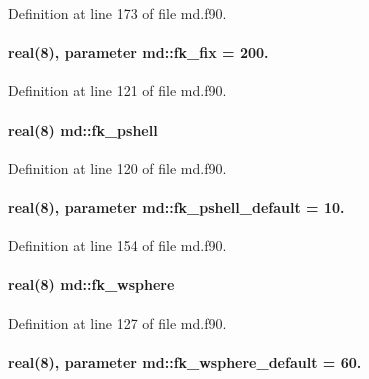 Definition at line 173 of file md.\-f90.

\hypertarget{classmd_a80630bc13d0b69db27dac5a0406c27ea}{
\paragraph[{fk\-\_\-fix}]{\setlength{\rightskip}{0pt plus 5cm}real(8), parameter md\-::fk\-\_\-fix = 200.}}\label{classmd_a80630bc13d0b69db27dac5a0406c27ea}


Definition at line 121 of file md.\-f90.

\hypertarget{classmd_a9cf8babc8459710c3746e62d536652b9}{
\paragraph[{fk\-\_\-pshell}]{\setlength{\rightskip}{0pt plus 5cm}real(8) md\-::fk\-\_\-pshell}}\label{classmd_a9cf8babc8459710c3746e62d536652b9}


Definition at line 120 of file md.\-f90.

\hypertarget{classmd_a6f457c47b2d922765588fbac87e2a4e1}{
\paragraph[{fk\-\_\-pshell\-\_\-default}]{\setlength{\rightskip}{0pt plus 5cm}real(8), parameter md\-::fk\-\_\-pshell\-\_\-default = 10.}}\label{classmd_a6f457c47b2d922765588fbac87e2a4e1}


Definition at line 154 of file md.\-f90.

\hypertarget{classmd_a2b58774088e4de21731bf80f51c72b72}{
\paragraph[{fk\-\_\-wsphere}]{\setlength{\rightskip}{0pt plus 5cm}real(8) md\-::fk\-\_\-wsphere}}\label{classmd_a2b58774088e4de21731bf80f51c72b72}


Definition at line 127 of file md.\-f90.

\hypertarget{classmd_a42a51ca3bf54461c029d7f016faad723}{
\paragraph[{fk\-\_\-wsphere\-\_\-default}]{\setlength{\rightskip}{0pt plus 5cm}real(8), parameter md\-::fk\-\_\-wsphere\-\_\-default = 60.}}\label{classmd_a42a51ca3bf54461c029d7f016faad723}


